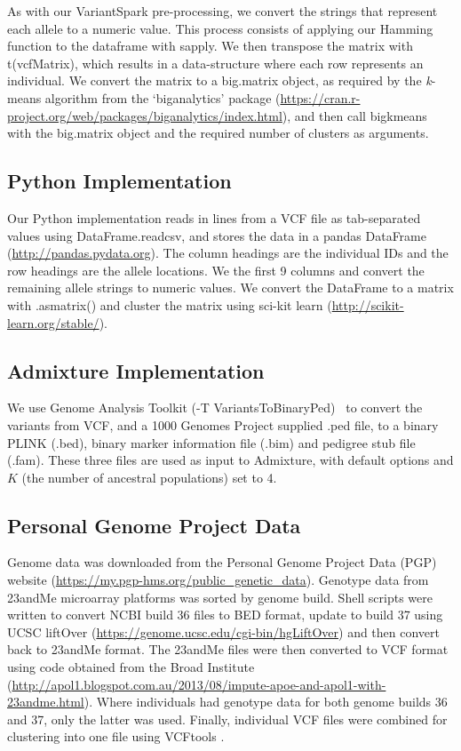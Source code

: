 \documentclass{bmcart}
\newcommand{\variantSpark}{{\sc VariantSpark}}
\newcommand{\kMeans}{\textit{k}-means}
\begin{document}
As with our \variantSpark{} pre-processing, we convert the strings that represent each allele to a numeric value. 
This process consists of applying our {\sc Hamming} function to the dataframe with {\sc sapply}.
We then transpose the matrix with {\sc t(vcfMatrix)}, which results in a data-structure where each row represents an individual. We convert the matrix to a {\sc big.matrix} object,
as required by the \kMeans{} algorithm from the `biganalytics' package (\url{https://cran.r-project.org/web/packages/biganalytics/index.html}), and then call {\sc bigkmeans} with
the {\sc big.matrix} object and the required number of clusters as arguments.

\subsection*{Python Implementation}
Our Python implementation reads in lines from a VCF file as tab-separated values using {\sc DataFrame.read\textunderscore{}csv}, and stores the data in a pandas DataFrame (\url{http://pandas.pydata.org}). The column headings are the individual IDs and the row headings are the allele locations.
We the first 9 columns and convert the remaining allele strings to numeric values.
We convert the DataFrame to a matrix with {\sc .as\textunderscore{}matrix()} and cluster the matrix using sci-kit learn (\url{http://scikit-learn.org/stable/}).

\subsection*{{\sc Admixture} Implementation}
We use Genome Analysis Toolkit ({\sc -T VariantsToBinaryPed})~\cite{McKenna2010} to convert the variants from VCF, and a 1000 Genomes Project supplied .ped file, to a binary PLINK (.bed), binary marker information file (.bim) and pedigree stub file (.fam).
These three files are used as input to {\sc Admixture}, with default options and $K$ (the number of ancestral populations) set to 4.

\subsection*{Personal Genome Project Data}
Genome data was downloaded from the Personal Genome Project Data (PGP) website (\url{https://my.pgp-hms.org/public_genetic_data}). Genotype data from 23andMe microarray platforms was sorted by genome 
build. Shell scripts were written to convert NCBI build 36 files to BED format, update to build 37 using UCSC liftOver (\url{https://genome.ucsc.edu/cgi-bin/hgLiftOver}) and 
then convert back to 23andMe format. The 23andMe files were then converted to VCF format using code obtained from the Broad Institute (\url{http://apol1.blogspot.com.au/2013/08/impute-apoe-and-apol1-with-23andme.html}). 
Where individuals had genotype data for both genome builds 36 and 37, only the latter was used. Finally, individual VCF files were combined for clustering into one 
file using VCFtools \cite{Danecek2011Variant}.
\end{document}
